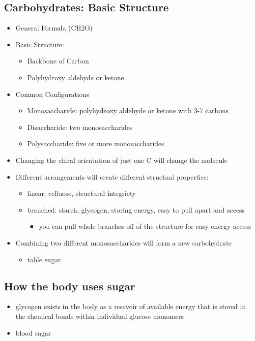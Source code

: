 \documentclass[11pt]{article}
\begin{document}
\subsection{Carbohydrates: Basic Structure}
\label{sec:orgdc6b753}
\begin{itemize}
\item General Formula (CH2O)
\item Basic Structure:
\begin{itemize}
\item Backbone of Carbon
\item Polyhydroxy aldehyde or ketone
\end{itemize}
\item Common Configurations
\begin{itemize}
\item Monosaccharide: polyhydeoxy aldehyde or ketone with 3-7 carbons
\item Disaccharide: two monosaccharides
\item Polysaccharide: five or more monosaccharides
\end{itemize}
\item Changing the chiral orientation of just one C will change the molecule
\item Different arrangements will create different structual properties:
\begin{itemize}
\item linear: celluose, structural integriety
\item branched: starch, glycogen, storing energy, easy to pull apart and access
\begin{itemize}
\item you can pull whole branches off of the structure for easy energy access
\end{itemize}
\end{itemize}
\item Combining two different monosaccharides will form a new carbohydrate
\begin{itemize}
\item table sugar
\end{itemize}
\end{itemize}
\subsection{How the body uses sugar}
\label{sec:org10fdec6}
\begin{itemize}
\item glycogen exists in the body as a resevoir of available energy that is stored in the chemical bonds within individual glucose monomers
\item blood sugar
\end{itemize}
\end{document}
